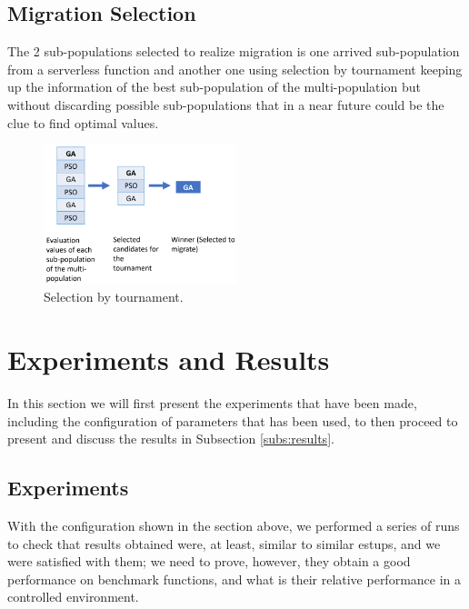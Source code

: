\documentclass[runningheads]{llncs}
\begin{document}
  \subsection{Migration Selection} The 2 sub-populations selected to realize
  migration is one arrived sub-population from a serverless function and another
  one using selection by tournament keeping up the information of the best
  sub-population of the multi-population but without discarding possible
  sub-populations that in a near future could be the clue to find optimal
  values.

\begin{figure}[htp]
  \centering
  \includegraphics[width=0.5\textwidth]{img/selection.png}
  \caption{Selection by tournament.} \label{fig5}
  \end{figure}


  \section{Experiments and Results}
  \label{sec:exp}

  In this section we will first present the experiments that have been
  made, including the configuration of parameters that has been used,
  to then proceed to present and discuss the results in Subsection
  \ref{subs:results}. 
    
  \subsection{Experiments}

With the configuration shown in the section above, we performed a
series of runs to check that results obtained were, at least, similar
to similar estups, and we were satisfied with them; we need to prove,
however, they obtain a good performance on benchmark functions, and
what is their relative performance in a controlled environment.
\end{document}
